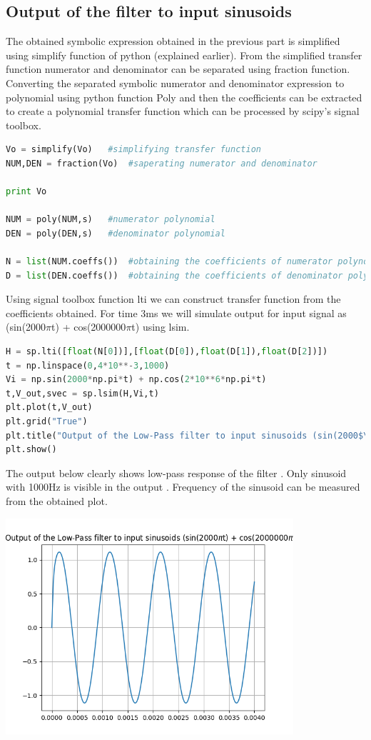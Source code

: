 \documentclass[a4paper]{article}
\begin{document}
\subsection{Output of the filter to input sinusoids}
The obtained symbolic expression obtained in the previous part is simplified using  simplify function of python (explained earlier). 
From the simplified transfer function numerator and denominator can be separated using  fraction function. Converting the separated symbolic numerator and denominator expression to polynomial using python function 
Poly and then the coefficients can be extracted to create a polynomial transfer function which can be processed by scipy's signal toolbox.
\begin{lstlisting}[language=Python]
Vo = simplify(Vo)	#simplifying transfer function
NUM,DEN = fraction(Vo)	#saperating numerator and denominator

print Vo

NUM = poly(NUM,s)	#numerator polynomial
DEN = poly(DEN,s)	#denominator polynomial

N = list(NUM.coeffs())	#obtaining the coefficients of numerator polynomial in list
D = list(DEN.coeffs())  #obtaining the coefficients of denominator polynomial in list

\end{lstlisting}
Using signal toolbox function lti we can construct transfer function from the coefficients obtained. For time  3ms we will simulate output for input signal as (sin(2000$\pi$t) + cos(2000000$\pi$t) using lsim.
\begin{lstlisting}[language=Python]
H = sp.lti([float(N[0])],[float(D[0]),float(D[1]),float(D[2])])
t = np.linspace(0,4*10**-3,1000)
Vi = np.sin(2000*np.pi*t) + np.cos(2*10**6*np.pi*t)
t,V_out,svec = sp.lsim(H,Vi,t)
plt.plot(t,V_out) 
plt.grid("True")
plt.title("Output of the Low-Pass filter to input sinusoids (sin(2000$\pi$t) + cos(2000000$\pi$t))")
plt.show()
\end{lstlisting}
The output below clearly shows low-pass response of the filter . Only sinusoid with 1000Hz is visible in the output . Frequency of the sinusoid can be measured from the obtained plot.
\begin{center}
\includegraphics[width=0.8\textwidth]{Figure_2.png}
\end{center}
\end{document}

